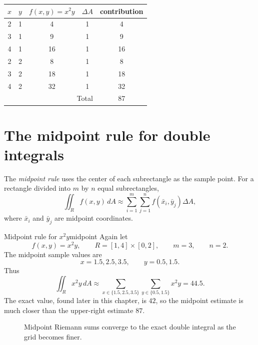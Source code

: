 \documentclass[11pt]{article}
\newcommand{\dA}{\,dA}
\begin{document}
\begin{center}
\begin{tabular}{@{}ccccc@{}}
\toprule
$x$ & $y$ & $f(x,y)=x^2y$ & $\Delta A$ & contribution \\
\midrule
2 & 1 & 4 & 1 & 4 \\
3 & 1 & 9 & 1 & 9 \\
4 & 1 & 16 & 1 & 16 \\
2 & 2 & 8 & 1 & 8 \\
3 & 2 & 18 & 1 & 18 \\
4 & 2 & 32 & 1 & 32 \\
\midrule
\multicolumn{4}{r}{Total} & 87 \\
\bottomrule
\end{tabular}
\end{center}

\section{The midpoint rule for double integrals}

The \emph{midpoint rule} uses the center of each subrectangle as the sample point. For a rectangle divided into $m$ by $n$ equal subrectangles,
\[
\iint_R f(x,y)\dA\approx \sum_{i=1}^m\sum_{j=1}^n f(\bar x_i,\bar y_j)\Delta A,
\]
where $\bar x_i$ and $\bar y_j$ are midpoint coordinates.

\begin{examplebox}{Midpoint rule for $x^2y$}{midpoint}
Again let
\[
f(x,y)=x^2y,\qquad R=[1,4]\times[0,2],\qquad m=3,\qquad n=2.
\]
The midpoint sample values are
\[
x=1.5,2.5,3.5,\qquad y=0.5,1.5.
\]
Thus
\[
\iint_R x^2y\dA\approx \sum_{x\in\{1.5,2.5,3.5\}}\sum_{y\in\{0.5,1.5\}}x^2y=44.5.
\]
The exact value, found later in this chapter, is $42$, so the midpoint estimate is much closer than the upper-right estimate $87$.
\end{examplebox}

\begin{figure}[H]
\centering
{}
\caption{Midpoint Riemann sums converge to the exact double integral as the grid becomes finer.}
\end{figure}
\end{document}
